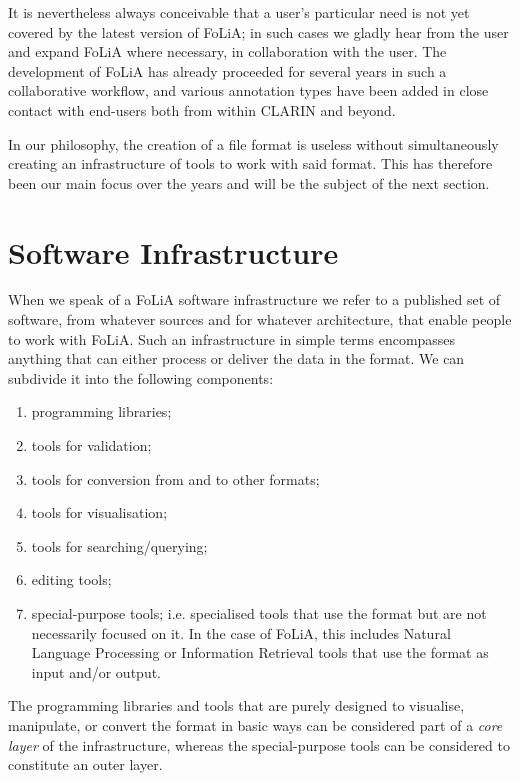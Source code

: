 \documentclass[a4paper,11pt]{article}
\begin{document}
It is nevertheless always conceivable that a user's particular need is not yet
covered by the latest version of FoLiA; in such cases we gladly hear from the
user and expand FoLiA where necessary, in collaboration with the user. The
development of FoLiA has already proceeded for several years in such a
collaborative workflow, and various annotation types have been added in close
contact with end-users both from within CLARIN and beyond.

In our philosophy, the creation of a file format is useless without
simultaneously creating an infrastructure of tools to work with said format.
This has therefore been our main focus over the years and will be the subject
of the next section.

\section{Software Infrastructure}
\label{sec:softwareinfrastructure}

When we speak of a FoLiA software infrastructure we refer to a published set of
software, from whatever sources and for whatever architecture, that enable
people to work with FoLiA. Such an infrastructure in simple terms encompasses
anything that can either process or deliver the data in the format. We can
subdivide it into the following components:

\begin{enumerate}
\item programming libraries;
\item tools for validation;
\item tools for conversion from and to other formats;
\item tools for visualisation;
\item tools for searching/querying;
\item editing tools;
\item special-purpose tools; i.e. specialised tools that use the format but are
    not necessarily focused on it. In the case of FoLiA, this includes Natural
    Language Processing or Information Retrieval tools that use the format as
    input and/or output.
\end{enumerate}

The programming libraries and tools that are purely designed to visualise,
manipulate, or convert the format in basic ways can be considered part of a
\emph{core layer} of the infrastructure, whereas the special-purpose tools can
be considered to constitute an outer layer.
\end{document}
